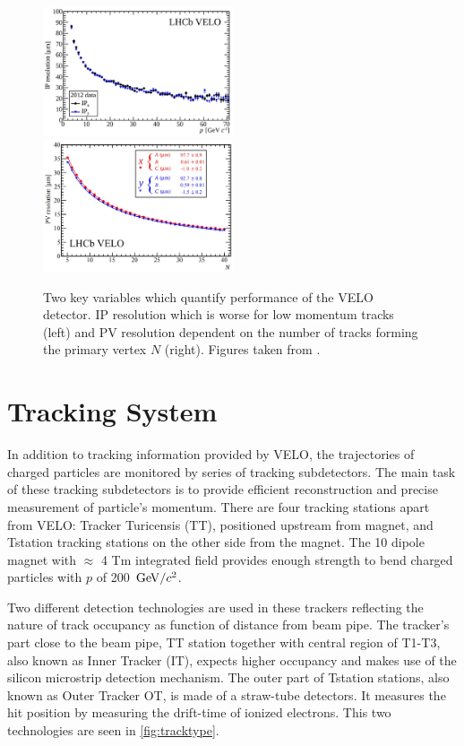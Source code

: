 \begin{figure}[!h]
	\centering
	\includegraphics[width = 0.5\textwidth]{figs/detector/IPresmhm.eps}%
        \includegraphics[width = 0.5\textwidth]{figs/detector/PVres.eps}
	\caption{Two key variables which quantify performance of the \Gls{VELO} detector. \Gls{IP} resolution which is worse for low momentum tracks (left) and \Gls{PV} resolution dependent on the number of tracks forming the primary vertex $N$ (right). Figures taken from \cite{LHCbVELOGroup:2014uea}.}
	\label{fig:veloIPres}
\end{figure}


\section{Tracking System}
In addition to tracking information provided by \Gls{VELO}, the trajectories of charged particles are monitored by series of tracking subdetectors. The main task of these tracking subdetectors is to provide efficient reconstruction and precise measurement of particle's momentum. There are four tracking stations apart from \Gls{VELO}: Tracker Turicensis (\Gls{TT}), positioned upstream from magnet, and  \Gls{Tstation} tracking stations on the other side from the magnet. The 10 \m dipole magnet with $\approx$ 4 Tm integrated field provides enough strength to bend charged particles with $p$ of 200 $\mathrm{\,Ge\kern -0.1em V}/c^{2}$.      

 Two different detection technologies are used in these trackers reflecting the nature of track occupancy as function of distance from beam pipe. The tracker's part close to the beam pipe, \Gls{TT} station together with central region of T1-T3, also known as Inner Tracker (\Gls{IT}), expects higher occupancy and makes use of the silicon microstrip detection mechanism. The outer part of \Gls{Tstation} stations, also known as Outer Tracker \Gls{OT}, is made of a straw-tube detectors. It measures the hit position by measuring the drift-time of ionized electrons. This two technologies are seen in \autoref{fig:tracktype}. 

